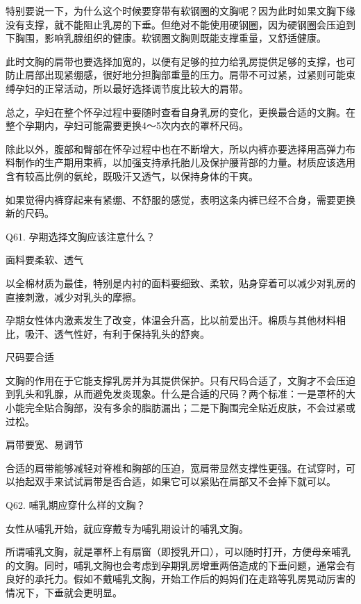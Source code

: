 \documentclass[12pt,UTF8]{ctexbook}
\begin{document}
特别要说一下，为什么这个时候要穿带有软钢圈的文胸呢？因为此时如果文胸下缘没有支撑，就不能阻止乳房的下垂。但绝对不能使用硬钢圈，因为硬钢圈会压迫到下胸围，影响乳腺组织的健康。软钢圈文胸则既能支撑重量，又舒适健康。

此时文胸的肩带也要选择加宽的，以便有足够的拉力给乳房提供足够的支撑，也可防止肩部出现紧绷感，很好地分担胸部重量的压力。肩带不可过紧，过紧则可能束缚孕妇的正常活动，所以最好选择调节度比较大的肩带。

总之，孕妇在整个怀孕过程中要随时查看自身乳房的变化，更换最合适的文胸。在整个孕期内，孕妇可能需要更换4～5次内衣的罩杯尺码。

除此以外，腹部和臀部在怀孕过程中也在不断增大，所以内裤亦要选择用高弹力布料制作的生产期用束裤，以加强支持承托胎儿及保护腰背部的力量。材质应该选用含有较高比例的氨纶，既吸汗又透气，以保持身体的干爽。

如果觉得内裤穿起来有紧绷、不舒服的感觉，表明这条内裤已经不合身，需要更换新的尺码。





Q61. 孕期选择文胸应该注意什么？


面料要柔软、透气

以全棉材质为最佳，特别是内衬的面料要细致、柔软，贴身穿着可以减少对乳房的直接刺激，减少对乳头的摩擦。

孕期女性体内激素发生了改变，体温会升高，比以前爱出汗。棉质与其他材料相比，吸汗、透气性好，有利于保持乳头的舒爽。

尺码要合适

文胸的作用在于它能支撑乳房并为其提供保护。只有尺码合适了，文胸才不会压迫到乳头和乳腺，从而避免发炎现象。什么是合适的尺码？两个标准：一是罩杯的大小能完全贴合胸部，没有多余的脂肪漏出；二是下胸围完全贴近皮肤，不会过紧或过松。

肩带要宽、易调节

合适的肩带能够减轻对脊椎和胸部的压迫，宽肩带显然支撑性更强。在试穿时，可以抬起双手来试试肩带是否合适，如果它可以紧贴在肩部又不会掉下就可以。





Q62. 哺乳期应穿什么样的文胸？


女性从哺乳开始，就应穿戴专为哺乳期设计的哺乳文胸。



所谓哺乳文胸，就是罩杯上有扇窗（即授乳开口），可以随时打开，方便母亲哺乳的文胸。同时，哺乳文胸也会考虑到孕期乳房增重两倍造成的下垂问题，通常会有良好的承托力。假如不戴哺乳文胸，开始工作后的妈妈们在走路等乳房晃动厉害的情况下，下垂就会更明显。
\end{document}
